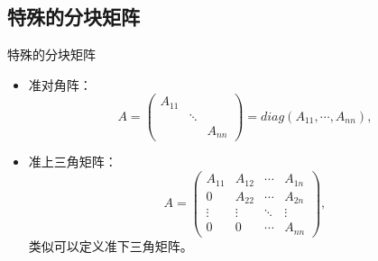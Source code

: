
\subsection{特殊的分块矩阵}


\begin{frame}

\begin{block}{特殊的分块矩阵}
\begin{itemize}
\item 准对角阵：
$$A = \begin{pmatrix} A_{11} & & \\ & \ddots & \\ & & A_{nn} \end{pmatrix} = diag(A_{11},\cdots,A_{nn}),$$
\item 准上三角矩阵：
$$A = \begin{pmatrix} A_{11} & A_{12} & \cdots & A_{1n} \\ 0 & A_{22} & \cdots & A_{2n} \\ \vdots & \vdots & \ddots & \vdots \\ 0 & 0 & \cdots & A_{nn} \end{pmatrix},$$
类似可以定义准下三角矩阵。
\end{itemize}
\end{block}

\end{frame}


